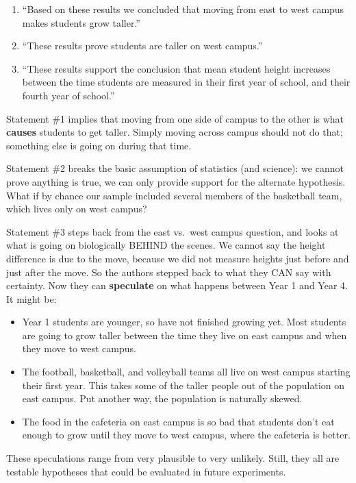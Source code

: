 \documentclass[
]{book}
\providecommand{\tightlist}{%
  \setlength{\itemsep}{0pt}\setlength{\parskip}{0pt}}
\begin{document}
\begin{enumerate}
\def\labelenumi{\arabic{enumi}.}
\tightlist
\item
  ``Based on these results we concluded that moving from east to west campus makes students grow taller.''
\item
  ``These results prove students are taller on west campus.''
\item
  ``These results support the conclusion that mean student height increases between the time students are measured in their first year of school, and their fourth year of school.''
\end{enumerate}

Statement \#1 implies that moving from one side of campus to the other is what \textbf{causes} students to get taller. Simply moving across campus should not do that; something else is going on during that time.

Statement \#2 breaks the basic assumption of statistics (and science): we cannot prove anything is true, we can only provide support for the alternate hypothesis. What if by chance our sample included several members of the basketball team, which lives only on west campus?

Statement \#3 steps back from the east vs.~west campus question, and looks at what is going on biologically BEHIND the scenes. We cannot say the height difference is due to the move, because we did not measure heights just before and just after the move. So the authors stepped back to what they CAN say with certainty. Now they can \textbf{speculate} on what happens between Year 1 and Year 4. It might be:

\begin{itemize}
\tightlist
\item
  Year 1 students are younger, so have not finished growing yet. Most students are going to grow taller between the time they live on east campus and when they move to west campus.
\item
  The football, basketball, and volleyball teams all live on west campus starting their first year. This takes some of the taller people out of the population on east campus. Put another way, the population is naturally skewed.
\item
  The food in the cafeteria on east campus is so bad that students don't eat enough to grow until they move to west campus, where the cafeteria is better.
\end{itemize}

These speculations range from very plausible to very unlikely. Still, they all are testable hypotheses that could be evaluated in future experiments.
\end{document}
